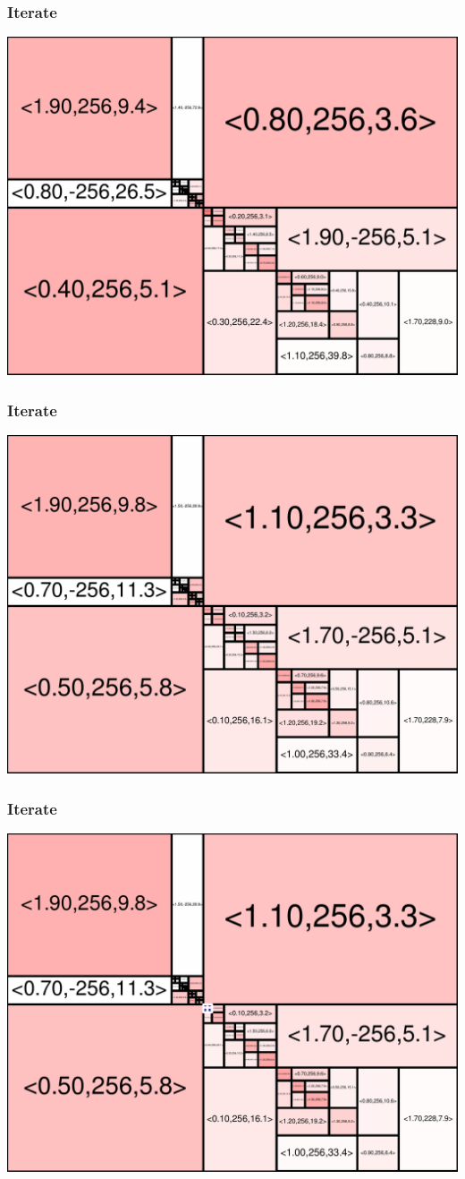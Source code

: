 \begin{frame}
\frametitle{Iterate}\begin{centering}\includegraphics[width=8.5 cm]{remy-graph/graph/test66.pdf}

\end{centering}\end{frame}


\begin{frame}
\frametitle{Iterate}\begin{centering}\includegraphics[width=8.5 cm]{remy-graph/graph/test67.pdf}

\end{centering}\end{frame}


\begin{frame}
\frametitle{Iterate}\begin{centering}\includegraphics[width=8.5 cm]{remy-graph/graph/test68.pdf}

\end{centering}\end{frame}


